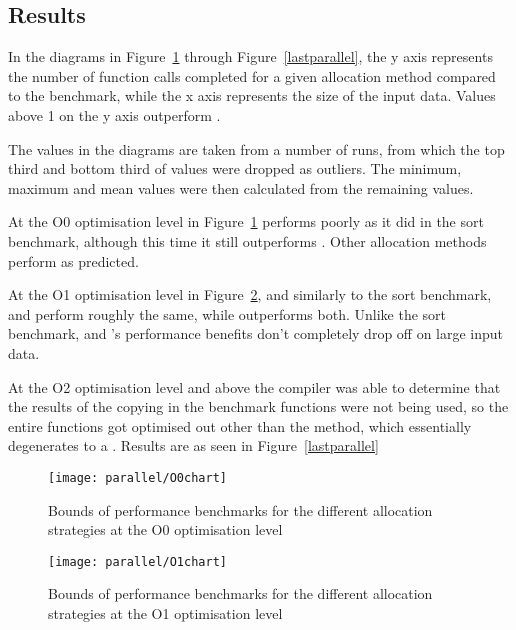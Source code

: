 \subsection{Results}

In the diagrams in Figure~\ref{firstparallel} through Figure~\ref{lastparallel}, the y axis represents the number of function calls completed for a given allocation method compared to the  benchmark, while the x axis represents the size of the input data. Values above 1 on the y axis outperform \malloc{}.

The values in the diagrams are taken from a number of runs, from which the top third and bottom third of values were dropped as outliers. The minimum, maximum and mean values were then calculated from the remaining values.

At the O0 optimisation level in Figure~\ref{firstparallel}  performs poorly as it did in the sort benchmark, although this time it still outperforms . Other allocation methods perform as predicted.

At the O1 optimisation level in Figure~\ref{parallelO1}, and similarly to the sort benchmark,  and  perform roughly the same, while  outperforms both. Unlike the sort benchmark,  and 's performance benefits don't completely drop off on large input data.

At the O2 optimisation level and above the compiler was able to determine that the results of the copying in the benchmark functions were not being used, so the entire functions got optimised out other than the  method, which essentially degenerates to a . Results are as seen in Figure~\ref{lastparallel}

\begin{figure}[hp]
	\centering
	\texttt{[image: parallel/O0chart]}
	\caption{Bounds of performance benchmarks for the different allocation strategies at the O0 optimisation level}\label{firstparallel}
\end{figure}

\begin{figure}[hp]
	\centering
	\texttt{[image: parallel/O1chart]}
	\caption{Bounds of performance benchmarks for the different allocation strategies at the O1 optimisation level}\label{parallelO1}
\end{figure}

